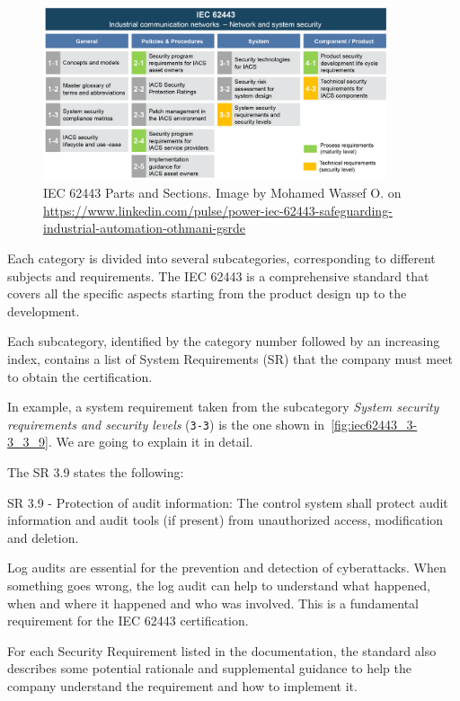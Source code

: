 \begin{figure}[ht]
  \centering
  \includegraphics[width=0.9\textwidth]{chapters/04/assets/iec62443.png}
  \caption[IEC 62443 Parts and Sections. Image by Mohamed Wassef O.]{IEC 62443 Parts and Sections. Image by Mohamed Wassef O. on \url{https://www.linkedin.com/pulse/power-iec-62443-safeguarding-industrial-automation-othmani-gsrde}}
  \label{fig:iec-62443}
\end{figure}

Each category is divided into several subcategories, corresponding to different subjects and requirements. The IEC 62443 is a comprehensive standard that covers all the specific aspects starting from the product design up to the development.

Each subcategory, identified by the category number followed by an increasing index, contains a list of System Requirements (SR) that the company must meet to obtain the certification.

In example, a system requirement taken from the subcategory \textit{System security requirements and security levels} (\texttt{3-3}) is the one shown in~\cref{fig:iec62443_3-3_3_9}. We are going to explain it in detail.

The SR 3.9 states the following:
\begin{mdframed}
  SR 3.9 - Protection of audit information: The control system shall protect audit information and audit tools (if present) from unauthorized access, modification and deletion.
\end{mdframed}\label{sr:3-3_3-9}

Log audits are essential for the prevention and detection of cyberattacks. When something goes wrong, the log audit can help to understand what happened, when and where it happened and who was involved. This is a fundamental requirement for the IEC 62443 certification.

For each Security Requirement listed in the documentation, the standard also describes some potential rationale and supplemental guidance to help the company understand the requirement and how to implement it.

